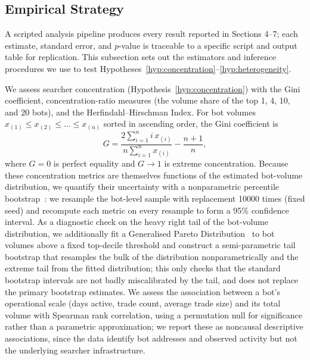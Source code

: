 \documentclass[pdflatex, sn-basic]{sn-jnl}
\theoremstyle{thmstylethree}%
\begin{document}
				\subsection{Empirical Strategy}
    \label{subsec:empirical-strategy}

    
    A scripted analysis pipeline produces every result reported in Sections 4–7; each estimate, standard error, and $p$-value is traceable to a specific script and output table for replication.
    This subsection sets out the estimators and inference procedures we use to test Hypotheses~\ref{hyp:concentration}--\ref{hyp:heterogeneity}.
    
    We assess searcher concentration (Hypothesis~\ref{hyp:concentration}) with the Gini coefficient, concentration-ratio measures (the volume share of the top 1, 4, 10, and 20 bots), and the Herfindahl--Hirschman Index.
    For bot volumes $x_{(1)} \le x_{(2)} \le \dots \le x_{(n)}$ sorted in ascending order, the Gini coefficient is
    \begin{equation}
    G = \frac{2 \sum_{i=1}^{n} i\, x_{(i)}}{n \sum_{i=1}^{n} x_{(i)}} - \frac{n+1}{n},
    \label{eq:gini}
    \end{equation}
    where $G=0$ is perfect equality and $G \to 1$ is extreme concentration.
    Because these concentration metrics are themselves functions of the estimated bot-volume distribution, we quantify their uncertainty with a nonparametric percentile bootstrap~\citep{EfronTibshirani1993}: we resample the bot-level sample with replacement \num{10000} times (fixed seed) and recompute each metric on every resample to form a 95\% confidence interval.
    As a diagnostic check on the heavy right tail of the bot-volume distribution, we additionally fit a Generalised Pareto Distribution~\citep{Coles2001} to bot volumes above a fixed top-decile threshold and construct a semi-parametric tail bootstrap that resamples the bulk of the distribution nonparametrically and the extreme tail from the fitted distribution; this only checks that the standard bootstrap intervals are not badly miscalibrated by the tail, and does not replace the primary bootstrap estimates.
    We assess the association between a bot's operational scale (days active, trade count, average trade size) and its total volume with Spearman rank correlation, using a permutation null for significance rather than a parametric approximation; we report these as noncausal descriptive associations, since the data identify bot addresses and observed activity but not the underlying searcher infrastructure.
    
\end{document}
